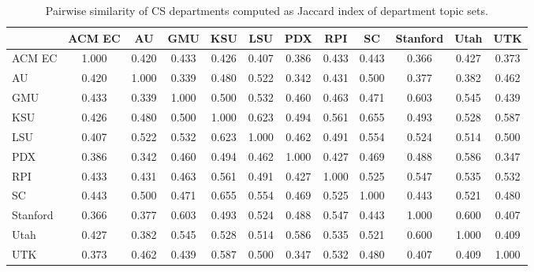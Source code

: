 \begin{table}
  \centering
  \begin{tabular}{lccccccccccc}
    \toprule
    & ACM EC & AU & GMU & KSU & LSU & PDX & RPI & SC & Stanford & Utah & UTK \\
    \midrule
    ACM EC & 1.000 & 0.420 & 0.433 & 0.426 & 0.407 & 0.386 & 0.433 & 0.443 & 0.366 & 0.427 & 0.373 \\
    AU & 0.420 & 1.000 & 0.339 & 0.480 & 0.522 & 0.342 & 0.431 & 0.500 & 0.377 & 0.382 & 0.462 \\
    GMU & 0.433 & 0.339 & 1.000 & 0.500 & 0.532 & 0.460 & 0.463 & 0.471 & 0.603 & 0.545 & 0.439 \\
    KSU & 0.426 & 0.480 & 0.500 & 1.000 & 0.623 & 0.494 & 0.561 & 0.655 & 0.493 & 0.528 & 0.587 \\
    LSU & 0.407 & 0.522 & 0.532 & 0.623 & 1.000 & 0.462 & 0.491 & 0.554 & 0.524 & 0.514 & 0.500 \\
    PDX & 0.386 & 0.342 & 0.460 & 0.494 & 0.462 & 1.000 & 0.427 & 0.469 & 0.488 & 0.586 & 0.347 \\
    RPI & 0.433 & 0.431 & 0.463 & 0.561 & 0.491 & 0.427 & 1.000 & 0.525 & 0.547 & 0.535 & 0.532 \\
    SC & 0.443 & 0.500 & 0.471 & 0.655 & 0.554 & 0.469 & 0.525 & 1.000 & 0.443 & 0.521 & 0.480 \\
    Stanford & 0.366 & 0.377 & 0.603 & 0.493 & 0.524 & 0.488 & 0.547 & 0.443 & 1.000 & 0.600 & 0.407 \\
    Utah & 0.427 & 0.382 & 0.545 & 0.528 & 0.514 & 0.586 & 0.535 & 0.521 & 0.600 & 1.000 & 0.409 \\
    UTK & 0.373 & 0.462 & 0.439 & 0.587 & 0.500 & 0.347 & 0.532 & 0.480 & 0.407 & 0.409 & 1.000 \\
    \bottomrule
  \end{tabular}
  \caption{Pairwise similarity of CS departments computed as Jaccard index of department topic sets.\label{tbl:heatmap-key}}
\end{table}

